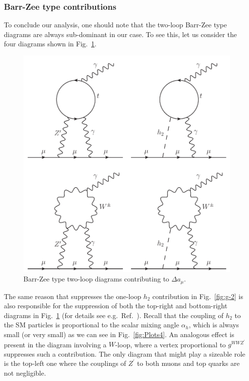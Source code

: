 \documentclass[10pt]{report}
\begin{document}
\subsubsection{Barr-Zee type contributions}
\label{sec:BarrZee}

To conclude our analysis, one should note that the two-loop Barr-Zee type diagrams \cite{Barr:1990vd} are always sub-dominant in our case. To see this, let us consider the four diagrams shown in Fig.~\ref{fig:Barr-Zee}.
\begin{figure}[!htb]
	\centering
	\includegraphics[scale=0.6]{Images/BLSM_2/Barr-Zee.pdf}
	\caption{Barr-Zee type two-loop diagrams contributing to $\Delta a_\mu$.}
	\label{fig:Barr-Zee}
\end{figure}	
The same reason that suppresses the one-loop $h_2$ contribution in Fig.~\ref{fig:g-2} is also responsible for the suppression of both the top-right and bottom-right diagrams in Fig.~\ref{fig:Barr-Zee} (for details see e.g.~Ref.~\cite{Ilisie:2015tra}). Recall that the coupling of $h_2$ to the SM particles is proportional to the scalar mixing angle $\alpha_h$, which is always small (or very small) as we can see in Fig.~\ref{fig:Plots4}. An analogous effect is present in the diagram involving a $W$-loop, where a vertex proportional to $g^{WWZ^\prime}$ suppresses such a contribution. The only diagram that might play a sizeable role is the top-left one where the couplings of $Z^\prime$ to both muons and top quarks are not negligible.
\end{document}
